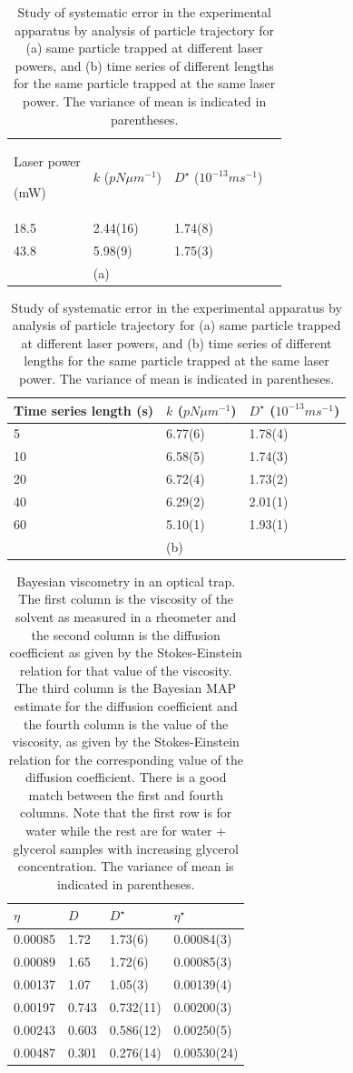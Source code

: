 \documentclass[fleqn,10pt]{wlscirep}
\begin{document}
\begin{table}
\begin{tabular}{|l|l|l|l|}
\cmidrule{1-3} 
Laser power

(mW) & $k$ ($pN\mu m^{-1}$) & $D^{\star}$ ($10^{-13}ms^{-1}$) & \tabularnewline
\cmidrule{1-3} 
18.5 & 2.44(16) & 1.74(8) & \tabularnewline
\cmidrule{1-3} 
43.8 & 5.98(9) & 1.75(3)  & \tabularnewline
\cmidrule{1-3} 
 & (a) &  & \tabularnewline
\end{tabular}%
\begin{tabular}{|l|l|l|}
\toprule 
Time series length (s) & $k$ ($pN\mu m^{-1}$) & $D^{\star}$ ($10^{-13}ms^{-1}$)\tabularnewline
\midrule 
5 & 6.77(6) & 1.78(4)\tabularnewline
\midrule 
10 & 6.58(5) & 1.74(3) \tabularnewline
\midrule 
20 & 6.72(4) & 1.73(2)\tabularnewline
\midrule 
40 & 6.29(2) & 2.01(1)\tabularnewline
\midrule 
60 & 5.10(1) & 1.93(1)\tabularnewline
\midrule
 & (b) & \tabularnewline
\end{tabular}\caption{\label{tab:systematic-error}Study of systematic error in the experimental
apparatus by analysis of particle trajectory for (a) same particle
trapped at different laser powers, and (b) time series of different
lengths for the same particle trapped at the same laser power. The variance of mean is indicated in parentheses.  }
\end{table}
\begin{table}
\begin{tabular}{|l|l|l|l|}
\hline 
$\eta$ & $D$ & $D^{\star}$ & $\eta^{\star}$\tabularnewline
\midrule 
0.00085 & 1.72 & 1.73(6) & 0.00084(3)\tabularnewline
\midrule 
0.00089 & 1.65 & 1.72(6)  & 0.00085(3)\tabularnewline
\midrule 
0.00137 & 1.07 & 1.05(3) & 0.00139(4)\tabularnewline
\midrule 
0.00197 & 0.743 & 0.732(11) & 0.00200(3)\tabularnewline
\midrule 
0.00243 & 0.603 & 0.586(12) & 0.00250(5)\tabularnewline
\midrule 
0.00487 & 0.301 & 0.276(14) & 0.00530(24)\tabularnewline
\bottomrule
\end{tabular}\caption{Bayesian viscometry in an optical trap. The first column is the viscosity
of the solvent as measured in a rheometer and the second column is
the diffusion coefficient as given by the Stokes-Einstein relation
for that value of the viscosity. The third column is the Bayesian
MAP estimate for the diffusion coefficient and the fourth column is
the value of the viscosity, as given by the Stokes-Einstein relation
for the corresponding value of the diffusion coefficient. There is
a good match between the first and fourth columns. Note that the first
row is for water while the rest are for water + glycerol samples with
increasing glycerol concentration. The variance of mean is indicated in parentheses. \label{tab:viscometry}}
\end{table}
\end{document}
